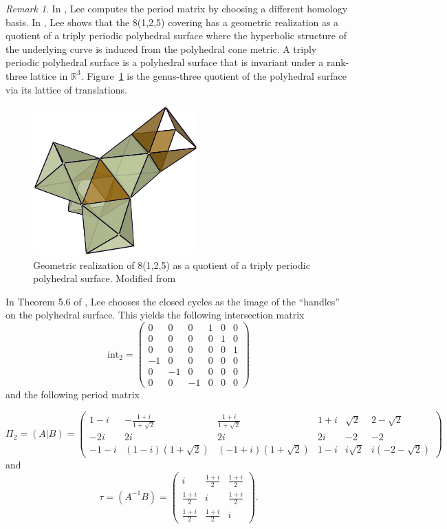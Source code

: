 \documentclass[12pt,reqno]{amsart}
\newcommand{\R}{\mathbb{R}}
\theoremstyle{definition}
\theoremstyle{remark}
\newtheorem*{remark}{Remark}
\begin{document}
\begin{remark} In \cite{dthesis}, Lee computes the period matrix by choosing a different homology basis. In \cite{dami}, Lee shows that the 8(1,2,5) covering has a geometric realization as a quotient of a triply periodic polyhedral surface where the hyperbolic structure of the underlying curve is induced from the polyhedral cone metric. A triply periodic polyhedral surface is a polyhedral surface that is invariant under a rank-three lattice in $\R^3.$ Figure~\ref{fig:funda} is the genus-three quotient of the polyhedral surface via its lattice of translations. 

\begin{figure}[htbp]
   \centering
   \includegraphics[width=2.5in]{figures/funda.png} 
  \caption{Geometric realization of 8(1,2,5) as a quotient of a triply periodic polyhedral surface. Modified from \cite{dami}}
  \label{fig:funda}
\end{figure}

In Theorem 5.6 of \cite{dthesis}, Lee chooses the closed cycles as the image of the ``handles'' on the polyhedral surface. This yields the following intersection matrix 
$$\textrm{int}_2 = \begin{pmatrix} 0 & 0 & 0 & 1 & 0 & 0 \\
 0 & 0 & 0 & 0 & 1 & 0 \\
 0 & 0 & 0 & 0 & 0 & 1 \\
 -1 & 0 & 0 & 0 & 0 & 0 \\
 0 & -1 & 0 & 0 & 0 & 0 \\
 0 & 0 & -1 & 0 & 0 & 0\end{pmatrix}$$ and the following period matrix

$$\Pi_2 = (A|B) = \begin{pmatrix}  1 - i& -\frac{1 + i}{1 + \sqrt{2}}& \frac{1 + i}{1 + \sqrt{2}}& 1 + i& \sqrt{2}& 2 - \sqrt{2} \\  -2i& 2i& 2i& 2i& -2& -2\\ -1 - i & (1 - i)(1 + \sqrt{2})& (-1 + i)(1 + \sqrt{2})& 1 - i& i\sqrt{2}& i(-2 - \sqrt{2})  \end{pmatrix} $$ and $$\tau = (A^{-1}B) = \begin{pmatrix}i & \frac{1 + i}{2} & \frac{1 + i}{2}\\
\frac{1 + i}{2} & i & \frac{1 + i}{2}\\
\frac{1 + i}{2} & \frac{1 + i}{2} & i\end{pmatrix}.$$
\end{remark}
\end{document}
